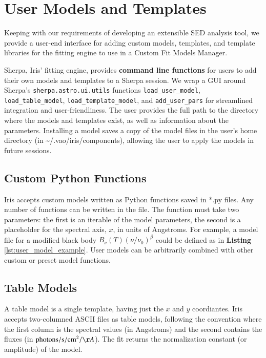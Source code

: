 \documentclass[preprint,12pt,3p]{elsarticle}
\begin{document}
\section{User Models and Templates}
\label{sec:usermodels}

Keeping with our requirements of developing an extensible SED analysis tool, we provide a user-end interface for adding custom models, templates, and template libraries for the fitting engine to use in a Custom Fit Models Manager.

Sherpa, Iris' fitting engine, provides \textbf{command line functions} for users to add their own models and templates to a Sherpa session. We wrap a GUI around Sherpa's \texttt{sherpa.astro.ui.utils} functions \texttt{load\_user\_model}, \texttt{load\_table\_model}, \texttt{load\_template\_model}, and \texttt{add\_user\_pars} for streamlined integration and user-friendliness. The user provides the full path to the directory where the models and templates exist, as well as information about the parameters. Installing a model saves a copy of the model files in the user's home directory (in \~{}/.vao/iris/components), allowing the user to apply the models in future sessions.


\subsection{Custom Python Functions}
Iris accepts custom models written as Python functions saved in *.py files. Any number of functions can be written in the file. The function must take two parameters: the first is an iterable of the model parameters, the second is a placeholder for the spectral axis, $x$, in units of Angstroms. For example, a model file for a modified black body
\(B_{\nu}(T) \left(\nu/\nu_{0}\right)^{\beta}\)
could be defined as in \textbf{Listing} \ref{lst:user_model_example}. User models can be arbitrarily combined with other custom or preset model functions.

\subsection{Table Models}
A table model is a single template, having just the $x$ and $y$ coordiantes. Iris accepts two-columned ASCII files as table models, following the convention where the first column is the spectral values (in Angstroms) and the second contains the fluxes (in $\mathrm{photons}/\mathrm{s}/\mathrm{cm}^{2}/{\AA}$). The fit returns the normalization constant (or amplitude) of the model.
\end{document}
